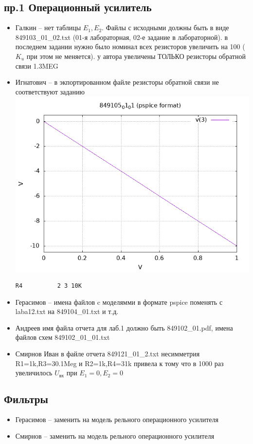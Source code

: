 \subsection*{пр.1 Операционный усилитель}
\begin{itemize}
	\item Галкин -- нет таблицы $E_1,E_2$. Файлы с исходными должны быть в виде 849103\_01\_02.txt (01-я лабораторная, 02-е задание в лабораторной).
в последнем задании нужно было номинал всех  резисторов увеличить на 100 ($K_u$ при этом не меняется). у автора увеличены ТОЛЬКО резисторы обратной связи  1.3MEG

\item Игнатович -- в экпортированном файле резисторы обратной связи не соответствуют заданию
\includegraphics[scale=0.2]{"849105_01_01"}
\begin{verbatim}
R4          2 3 10K
\end{verbatim}
\item Герасимов -- %
имена файлов c моделямми в формате pspice поменять с laba12.txt на 849104\_01.txt и т.д.

\item Андреев имя файла отчета для лаб.1 должно быть 849102\_01.pdf, имена файлов схем 849102\_01\_01.txt
\item   Смирнов Иван в файле отчета  849121\_01\_2.txt несимметрия R1=1k,R3=30.1Meg и R2=1k,R4=31k привела к тому что в 1000 раз увеличилось $U_\text{вх}$  при $E_1=0, E_2=0$
\end{itemize}

\subsection*{Фильтры}
\begin{itemize}
\item Герасимов --  заменить на модель рельного операционного усилителя
\item Смирнов --  заменить на модель рельного операционного усилителя
\end{itemize}

